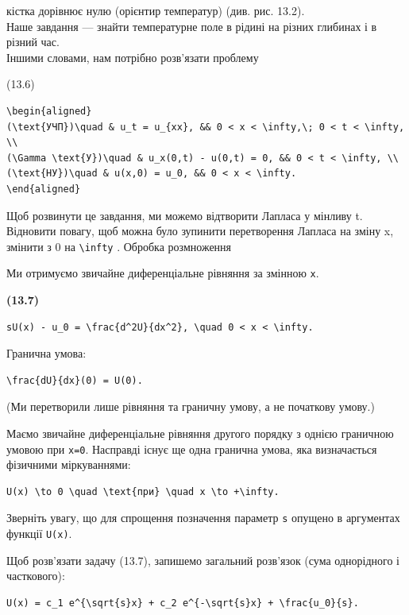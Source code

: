 \documentclass[
  ukrainian,
]{article}
\begin{document}
кістка дорівнює нулю (орієнтир температур) (див. рис. 13.2).\\
Наше завдання --- знайти температурне поле в рідині на різних глибинах і
в різний час.\\
Іншими словами, нам потрібно розв'язати проблему

(13.6)

\begin{verbatim}
\begin{aligned}
(\text{УЧП})\quad & u_t = u_{xx}, && 0 < x < \infty,\; 0 < t < \infty, \\
(\Gamma \text{У})\quad & u_x(0,t) - u(0,t) = 0, && 0 < t < \infty, \\
(\text{НУ})\quad & u(x,0) = u_0, && 0 < x < \infty.
\end{aligned}
\end{verbatim}

Щоб розвинути це завдання, ми можемо відтворити Лапласа у мінливу t.
Відновити повагу, щоб можна було зупинити перетворення Лапласа на зміну
x, змінити з 0 на \texttt{\textbackslash{}infty} . Обробка розмноження

Ми отримуємо звичайне диференціальне рівняння за змінною \texttt{x}.

\textbf{(13.7)}

\begin{verbatim}
sU(x) - u_0 = \frac{d^2U}{dx^2}, \quad 0 < x < \infty.
\end{verbatim}

Гранична умова:

\begin{verbatim}
\frac{dU}{dx}(0) = U(0).
\end{verbatim}

(Ми перетворили лише рівняння та граничну умову, а не початкову умову.)

Маємо звичайне диференціальне рівняння другого порядку з однією
граничною умовою при \texttt{x=0}. Насправді існує ще одна гранична
умова, яка визначається фізичними міркуваннями:

\begin{verbatim}
U(x) \to 0 \quad \text{при} \quad x \to +\infty.
\end{verbatim}

Зверніть увагу, що для спрощення позначення параметр \texttt{s} опущено
в аргументах функції \texttt{U(x)}.

Щоб розв'язати задачу (13.7), запишемо загальний розв'язок (сума
однорідного і часткового):

\begin{verbatim}
U(x) = c_1 e^{\sqrt{s}x} + c_2 e^{-\sqrt{s}x} + \frac{u_0}{s}.
\end{verbatim}
\end{document}
